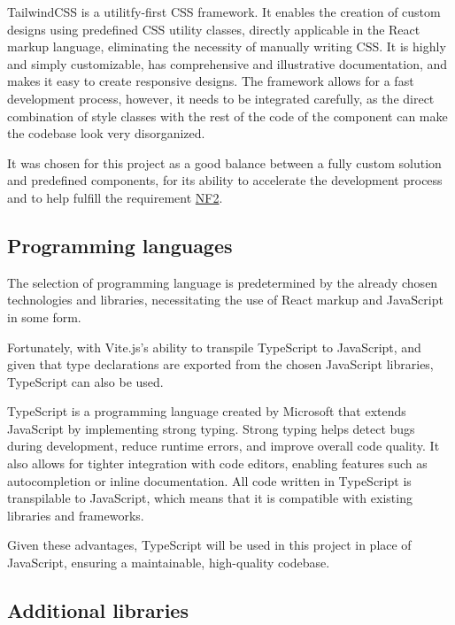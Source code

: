 TailwindCSS is a utilitfy-first CSS framework. It enables the creation of custom designs using predefined CSS utility classes, directly applicable in the React markup language, eliminating the necessity of manually writing CSS. It is highly and simply customizable, has comprehensive and illustrative documentation, and makes it easy to create responsive designs. The framework allows for a fast development process, however, it needs to be integrated carefully, as the direct combination of style classes with the rest of the code of the component can make the codebase look very disorganized. \cite{TailwindCSS}

It was chosen for this project as a good balance between a fully custom solution and predefined components, for its ability to accelerate the development process and to help fulfill the requirement \hyperref[itm:NF2]{NF2}.


\subsection{Programming languages}

The selection of programming language is predetermined by the already chosen technologies and libraries, necessitating the use of React markup and JavaScript in some form.

Fortunately, with Vite.js's ability to transpile TypeScript to JavaScript, and given that type declarations are exported from the chosen JavaScript libraries, TypeScript can also be used. \cite{Said2023}

TypeScript is a programming language created by Microsoft that extends JavaScript by implementing strong typing. Strong typing helps detect bugs during development, reduce runtime errors, and improve overall code quality. It also allows for tighter integration with code editors, enabling features such as autocompletion or inline documentation. All code written in TypeScript is transpilable to JavaScript, which means that it is compatible with existing libraries and frameworks. \cite{TypeScript}

Given these advantages, TypeScript will be used in this project in place of JavaScript, ensuring a maintainable, high-quality codebase.


\subsection{Additional libraries}

